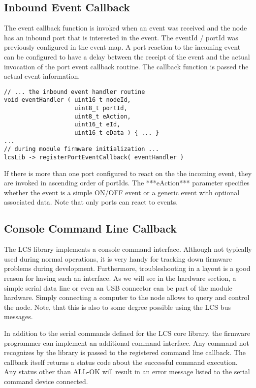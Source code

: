 \subsection{Inbound Event Callback}

The event callback function is invoked when an event was received and the node has an inbound port that is interested in the event. The eventId / portId was previously configured in the event map. A port reaction to the incoming event can be configured to have a delay between the receipt of the event and the actual invocation of the port event callback routine. The callback function is passed the actual event information.

\lstset{style=codesnippetstyle}
\begin{lstlisting}
// ... the inbound event handler routine
void eventHandler ( uint16_t nodeId, 
                    uint8_t portId, 
                    uint8_t eAction,
                    uint16_t eId, 
                    uint16_t eData ) { ... }
...
// during module firmware initialization ...
lcsLib -> registerPortEventCallback( eventHandler )
\end{lstlisting}

If there is more than one port configured to react on the the incoming event, they are invoked in ascending order of portIds. The ***eAction*** parameter specifies whether the event is a simple ON/OFF event or a generic event with optional associated data. Note that only ports can react to events.

\subsection{Console Command Line Callback}

The LCS library implements a console command interface. Although not typically used during normal operations, it is very handy for tracking down firmware problems during development. Furthermore, troubleshooting in a layout is a good reason for having such an interface. As we will see in the hardware section, a simple serial data line or even an USB connector can be part of the module hardware. Simply connecting a computer to the node allows to query and control the node. Note, that this is also to some degree possible using the LCS bus messages.

In addition to the serial commands defined for the LCS  core library, the firmware programmer can implement an additional command interface. Any command not recognizes by the library is passed to the registered command line callback. The callback itself returns a status code about the successful command execution. Any status other than ALL-OK will result in an error message listed to the serial command device connected.

